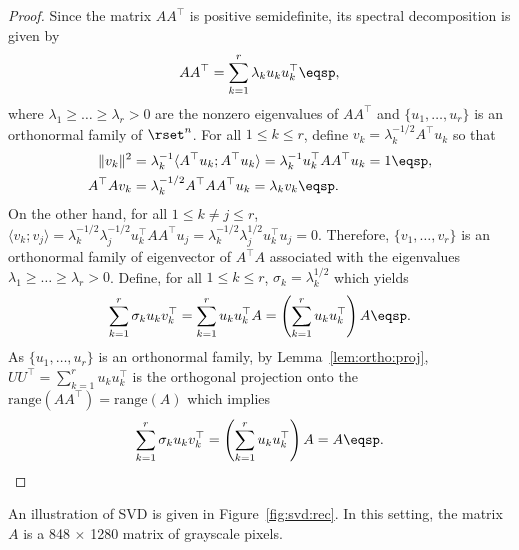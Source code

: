 \begin{proof}
Since the matrix $AA^\top$ is positive semidefinite, its spectral decomposition is given by
\[
AA^\top = \sum_{k=1}^r \lambda_k u_k u^\top_k\eqsp,
\]
where $\lambda_1\geqslant \ldots\geqslant \lambda_r>0$ are the nonzero eigenvalues of $AA^\top$ and $\{u_1,\ldots,u_r\}$ is an orthonormal family of $\rset^n$. For all $1\leqslant k\leqslant r$, define $v_k = \lambda_k^{-1/2}A^\top u_k$ so that
\begin{align*}
\|v_k\|^2&=\lambda_k^{-1}\langle A^\top u_k;A^\top u_k\rangle = \lambda_k^{-1} u_k^\top AA^\top u_k = 1\eqsp, \\
A^\top Av_k & = \lambda_k^{-1/2}A^\top A A^\top u_k  = \lambda_k v_k\eqsp.
\end{align*}
On the other hand, for all $1\leqslant k\neq j\leqslant r$, $\langle v_k;v_j\rangle = \lambda_k^{-1/2}\lambda_j^{-1/2}u^\top_kA A^\top u_j =\lambda_k^{-1/2}\lambda_j^{1/2}u^\top_ku_j = 0$. Therefore, $\{v_1,\ldots,v_r\}$ is an orthonormal family of eigenvector of $A^\top A$ associated with the eigenvalues $\lambda_1\geqslant \ldots\geqslant \lambda_r>0$. 
Define, for all $1\leqslant k\leqslant r$, $\sigma_k = \lambda_k^{1/2}$ which yields
\[
\sum_{k=1}^r \sigma_k u_k v^\top_k = \sum_{k=1}^r  u_k u^\top_kA = \left(\sum_{k=1}^r  u_k u^\top_k\right)A\eqsp.
\]
As $\{u_1,\ldots,u_r\}$ is an orthonormal family, by Lemma~\ref{lem:ortho:proj}, $UU^\top = \sum_{k=1}^r u_ku^\top_k$ is the orthogonal projection onto the $\mathrm{range}(AA^\top) = \mathrm{range}(A)$ which implies
\[
\sum_{k=1}^r \sigma_k u_k v^\top_k = \left(\sum_{k=1}^r  u_k u^\top_k\right)A = A\eqsp.
\]
\end{proof}
An illustration of SVD is given in Figure~\ref{fig:svd:rec}. In this setting, the matrix $A$ is a 848 $\times$ 1280 matrix of grayscale pixels. 
